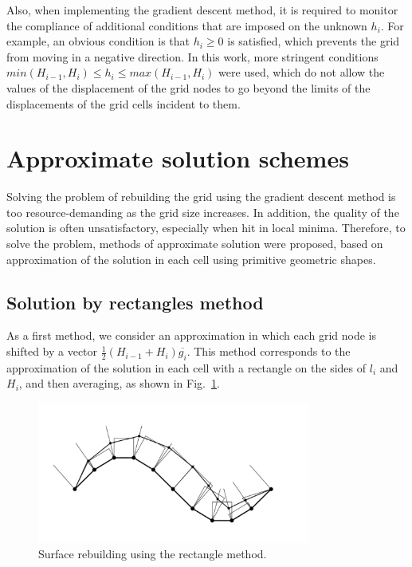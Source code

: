 \documentclass[
11pt,%
tightenlines,%
twoside,%
onecolumn,%
nofloats,%
nobibnotes,%
nofootinbib,%
superscriptaddress,%
noshowpacs,%
centertags]%
{revtex4}
\begin{document}
Also, when implementing the gradient descent method, it is required to monitor the compliance of additional conditions that are imposed on the unknown $h_i$.
For example, an obvious condition is that $h_i \ge 0$ is satisfied, which prevents the grid from moving in a negative direction.
In this work, more stringent conditions $min(H_{i - 1}, H_i) \le h_i \le max(H_{i - 1}, H_i)$ were used, which do not allow the values of the displacement of the grid nodes to go beyond the limits of the displacements of the grid cells incident to them.

\section{Approximate solution schemes}

Solving the problem of rebuilding the grid using the gradient descent method is too resource-demanding as the grid size increases.
In addition, the quality of the solution is often unsatisfactory, especially when hit in local minima.
Therefore, to solve the problem, methods of approximate solution were proposed, based on approximation of the solution in each cell using primitive geometric shapes.

\subsection{Solution by rectangles method}

As a first method, we consider an approximation in which each grid node is shifted by a vector $\frac{1}{2}(H_{i - 1} + H_i)\overline{g_i}$.
This method corresponds to the approximation of the solution in each cell with a rectangle on the sides of $l_i$ and $H_i$, and then averaging, as shown in Fig.~\ref{fig:grid_rectangles}.

\begin{figure}[h]
\setcaptionmargin{5mm}
\onelinecaptionstrue
\includegraphics[width=0.8\textwidth]{pics/grid_rectangles.pdf}
\caption{Surface rebuilding using the rectangle method.}
\label{fig:grid_rectangles}
\end{figure}
\end{document}
